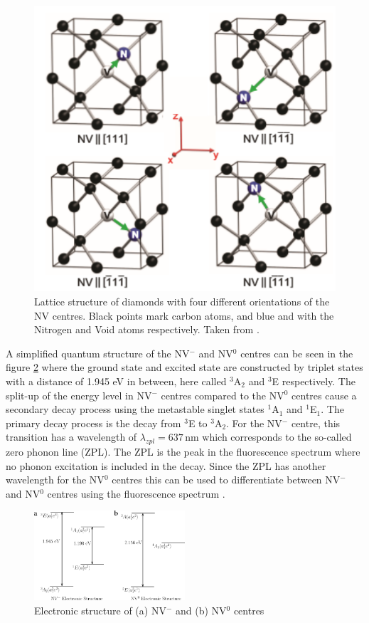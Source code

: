  \begin{figure}
 	\centering
 	\includegraphics[width=0.5\linewidth]{../figures/NClatt}
 	\caption[Different orientations of the NV centres]{Lattice structure of diamonds with four different orientations of the NV centres. Black points mark carbon atoms, and blue and with the Nitrogen and Void atoms respectively. Taken from \cite{pham_magnetic_nodate}.}
 	\label{fig:nclatt}
 \end{figure}
 
 A simplified quantum structure of the NV$^-$ and NV$^0$ centres can be seen in the figure \ref{fig:nvcentres} where the ground state and excited state are constructed by triplet states with a distance of 1.945 eV in between, here called $^{3}$A$_{2}$ and $^{3}$E respectively. The split-up of the energy level in NV$^-$ centres compared to the NV$^0$ centres cause a secondary decay process using the metastable singlet states $^1$A$_1$ and $^1$E$_1$. The primary decay process is the decay from $^{3}$E to $^{3}$A$_{2}$. For the NV$^-$ centre, this transition has a wavelength of $\lambda_{zpl} = 637\,\mathrm{nm}$ which corresponds to the so-called zero phonon line (ZPL). The ZPL is the peak in the fluorescence spectrum where no phonon excitation is included in the decay. Since the ZPL has another wavelength for the NV$^0$ centres this can be used to differentiate between NV$^-$ and NV$^0$ centres using the fluorescence spectrum \cite{schirhagl_nitrogen-vacancy_2014}.\\

\begin{figure}
	
	\centering
	\includegraphics[width=0.5\textwidth]{../figures/nv-centre.png}
	\caption{Electronic structure of (a) NV$^-$ and (b) NV$^0$ centres \cite{doherty}}
	\label{fig:nvcentres}
\end{figure}


